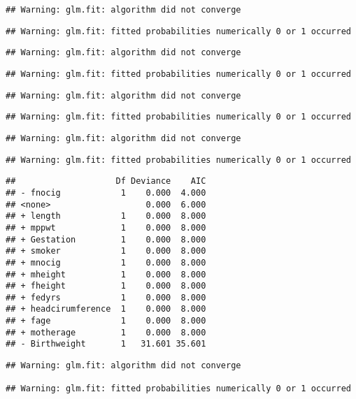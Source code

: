 \documentclass[]{article}
\begin{document}
\begin{verbatim}
## Warning: glm.fit: algorithm did not converge
\end{verbatim}

\begin{verbatim}
## Warning: glm.fit: fitted probabilities numerically 0 or 1 occurred
\end{verbatim}

\begin{verbatim}
## Warning: glm.fit: algorithm did not converge
\end{verbatim}

\begin{verbatim}
## Warning: glm.fit: fitted probabilities numerically 0 or 1 occurred
\end{verbatim}

\begin{verbatim}
## Warning: glm.fit: algorithm did not converge
\end{verbatim}

\begin{verbatim}
## Warning: glm.fit: fitted probabilities numerically 0 or 1 occurred
\end{verbatim}

\begin{verbatim}
## Warning: glm.fit: algorithm did not converge
\end{verbatim}

\begin{verbatim}
## Warning: glm.fit: fitted probabilities numerically 0 or 1 occurred
\end{verbatim}

\begin{verbatim}
##                    Df Deviance    AIC
## - fnocig            1    0.000  4.000
## <none>                   0.000  6.000
## + length            1    0.000  8.000
## + mppwt             1    0.000  8.000
## + Gestation         1    0.000  8.000
## + smoker            1    0.000  8.000
## + mnocig            1    0.000  8.000
## + mheight           1    0.000  8.000
## + fheight           1    0.000  8.000
## + fedyrs            1    0.000  8.000
## + headcirumference  1    0.000  8.000
## + fage              1    0.000  8.000
## + motherage         1    0.000  8.000
## - Birthweight       1   31.601 35.601
\end{verbatim}

\begin{verbatim}
## Warning: glm.fit: algorithm did not converge

## Warning: glm.fit: fitted probabilities numerically 0 or 1 occurred
\end{verbatim}
\end{document}
